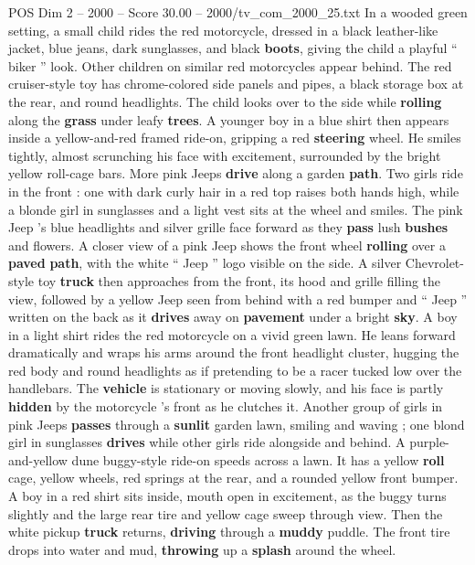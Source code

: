 \begin{textsample}{POS Dim 2 – 2000 – Score 30.00 – 2000/tv\_com\_2000\_25.txt}
In a wooded green setting, a small child rides the red motorcycle, dressed in a black leather-like jacket, blue jeans, dark sunglasses, and black \textbf{boots}, giving the child a playful “ biker ” look.
Other children on similar red motorcycles appear behind.
The red cruiser-style toy has chrome-colored side panels and pipes, a black storage box at the rear, and round headlights.
The child looks over to the side while \textbf{rolling} along the \textbf{grass} under leafy \textbf{trees}.
A younger boy in a blue shirt then appears inside a yellow-and-red framed ride-on, gripping a red \textbf{steering} wheel.
He smiles tightly, almost scrunching his face with excitement, surrounded by the bright yellow roll-cage bars.
More pink Jeeps \textbf{drive} along a garden \textbf{path}.
Two girls ride in the front : one with dark curly hair in a red top raises both hands high, while a blonde girl in sunglasses and a light vest sits at the wheel and smiles.
The pink Jeep ’s blue headlights and silver grille face forward as they \textbf{pass} lush \textbf{bushes} and flowers.
A closer view of a pink Jeep shows the front wheel \textbf{rolling} over a \textbf{paved} \textbf{path}, with the white “ Jeep ” logo visible on the side.
A silver Chevrolet-style toy \textbf{truck} then approaches from the front, its hood and grille filling the view, followed by a yellow Jeep seen from behind with a red bumper and “ Jeep ” written on the back as it \textbf{drives} away on \textbf{pavement} under a bright \textbf{sky}.
A boy in a light shirt rides the red motorcycle on a vivid green lawn.
He leans forward dramatically and wraps his arms around the front headlight cluster, hugging the red body and round headlights as if pretending to be a racer tucked low over the handlebars.
The \textbf{vehicle} is stationary or moving slowly, and his face is partly \textbf{hidden} by the motorcycle ’s front as he clutches it.
Another group of girls in pink Jeeps \textbf{passes} through a \textbf{sunlit} garden lawn, smiling and waving ; one blond girl in sunglasses \textbf{drives} while other girls ride alongside and behind.
A purple-and-yellow dune buggy-style ride-on speeds across a lawn.
It has a yellow \textbf{roll} cage, yellow wheels, red springs at the rear, and a rounded yellow front bumper.
A boy in a red shirt sits inside, mouth open in excitement, as the buggy turns slightly and the large rear tire and yellow cage sweep through view.
Then the white pickup \textbf{truck} returns, \textbf{driving} through a \textbf{muddy} puddle.
The front tire drops into water and mud, \textbf{throwing} up a \textbf{splash} around the wheel.

\end{textsample}
